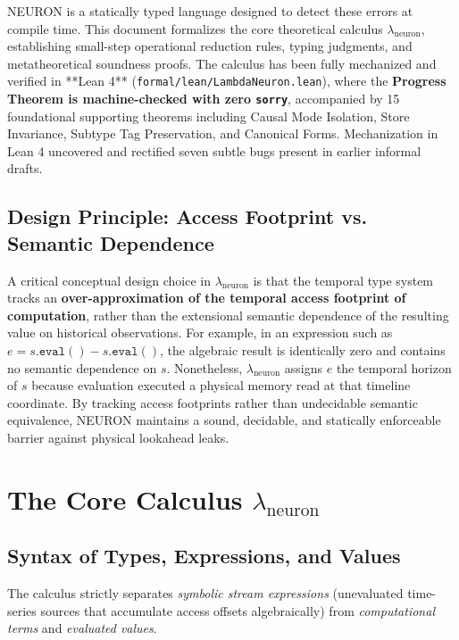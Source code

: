 \documentclass[11pt,a4paper]{article}
\theoremstyle{definition}
\theoremstyle{plain}
\newcommand{\ty}[1]{\texttt{#1}}
\begin{document}
NEURON is a statically typed language designed to detect these errors at compile time. This document formalizes the core theoretical calculus $\lambda_{\text{neuron}}$, establishing small-step operational reduction rules, typing judgments, and metatheoretical soundness proofs. The calculus has been fully mechanized and verified in **Lean 4** (\texttt{formal/lean/LambdaNeuron.lean}), where the \textbf{Progress Theorem is machine-checked with zero \texttt{sorry}}, accompanied by 15 foundational supporting theorems including Causal Mode Isolation, Store Invariance, Subtype Tag Preservation, and Canonical Forms. Mechanization in Lean 4 uncovered and rectified seven subtle bugs present in earlier informal drafts.

\subsection*{Design Principle: Access Footprint vs. Semantic Dependence}
A critical conceptual design choice in $\lambda_{\text{neuron}}$ is that the temporal type system tracks an \textbf{over-approximation of the temporal access footprint of computation}, rather than the extensional semantic dependence of the resulting value on historical observations. For example, in an expression such as $e = s.\ty{eval}() - s.\ty{eval}()$, the algebraic result is identically zero and contains no semantic dependence on $s$. Nonetheless, $\lambda_{\text{neuron}}$ assigns $e$ the temporal horizon of $s$ because evaluation executed a physical memory read at that timeline coordinate. By tracking access footprints rather than undecidable semantic equivalence, NEURON maintains a sound, decidable, and statically enforceable barrier against physical lookahead leaks.

\section{The Core Calculus $\lambda_{\text{neuron}}$}

\subsection{Syntax of Types, Expressions, and Values}

The calculus strictly separates \emph{symbolic stream expressions} (unevaluated time-series sources that accumulate access offsets algebraically) from \emph{computational terms} and \emph{evaluated values}.
\end{document}
